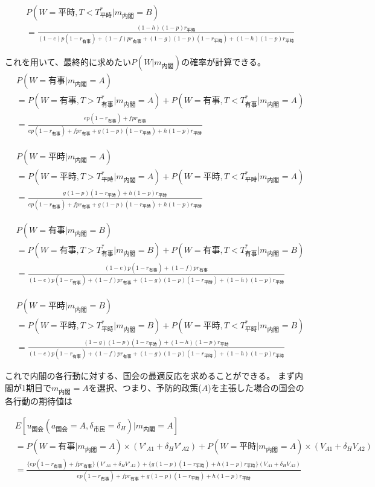 \documentclass[main.tex]{subfiles}
\begin{document}
\begin{align*}
    & P(W=平時, T<T^*_{平時} | m_{内閣}=B)\\[0.5em]
    &= \frac{ (1-h)(1-p)r_{平時} }{ (1-e)p(1-r_{有事}) + (1-f)pr_{有事} + (1-g)(1-p)(1-r_{平時}) + (1-h)(1-p)r_{平時} }
\end{align*}


これを用いて、最終的に求めたい$P(W|m_{内閣})$の確率が計算できる。
\begin{align*}
    & P(W=有事 | m_{内閣}=A)\\[0.5em]
    &= P(W=有事, T>T^*_{有事} | m_{内閣}=A) + P(W=有事, T<T^*_{有事} | m_{内閣}=A)\\[0.5em]
    &= \frac{ ep(1-r_{有事}) +  fpr_{有事}  }{ ep(1-r_{有事}) + fpr_{有事} + g(1-p)(1-r_{平時}) + h(1-p)r_{平時} }
\end{align*}

\begin{align*}
    & P(W=平時 | m_{内閣}=A)\\[0.5em]
    &= P(W=平時, T>T^*_{平時} | m_{内閣}=A) + P(W=平時, T<T^*_{平時} | m_{内閣}=A)\\[0.5em]
    &= \frac{  g(1-p)(1-r_{平時}) + h(1-p)r_{平時}  }{ ep(1-r_{有事}) + fpr_{有事} + g(1-p)(1-r_{平時}) + h(1-p)r_{平時} }
\end{align*}

\begin{align*}
    & P(W=有事 | m_{内閣}=B)\\[0.5em]
    &= P(W=有事, T>T^*_{有事} | m_{内閣}=B) + P(W=有事, T<T^*_{有事} | m_{内閣}=B)\\[0.5em]
    &= \frac{ (1-e)p(1-r_{有事}) +  (1-f)pr_{有事} }{ (1-e)p(1-r_{有事}) + (1-f)pr_{有事} + (1-g)(1-p)(1-r_{平時}) + (1-h)(1-p)r_{平時} }
\end{align*}

\begin{align*}
    & P(W=平時 | m_{内閣}=B)\\[0.5em]
    &= P(W=平時, T>T^*_{平時} | m_{内閣}=B) + P(W=平時, T<T^*_{平時} | m_{内閣}=B)\\[0.5em]
    &= \frac{ (1-g)(1-p)(1-r_{平時}) + (1-h)(1-p)r_{平時} }{ (1-e)p(1-r_{有事}) + (1-f)pr_{有事} + (1-g)(1-p)(1-r_{平時}) + (1-h)(1-p)r_{平時} }
\end{align*}

\bigskip
これで内閣の各行動に対する、国会の最適反応を求めることができる。
まず内閣が1期目で$m_{内閣}=A$を選択、つまり、予防的政策($A$)を主張した場合の国会の各行動の期待値は

\begin{align*}
    & E[u_{国会}(a_{国会}=A, \delta_{市民}=\delta_H) | m_{内閣} = A  ]\\[0.5em]
    &= P(W=有事 | m_{内閣}=A) × (V'_{A1} + \delta_H V'_{A2}) + P(W=平時 | m_{内閣}=A) × (V_{A1} + \delta_H V_{A2})\\[0.5em]
    &= \frac{ \{ep(1-r_{有事}) +  fpr_{有事}\}(V'_{A1} + \delta_H V'_{A2}) +  \{g(1-p)(1-r_{平時}) + h(1-p)r_{平時}\}(V_{A1} + \delta_H V_{A2})  }{ ep(1-r_{有事}) + fpr_{有事} + g(1-p)(1-r_{平時}) + h(1-p)r_{平時} }
\end{align*}
\end{document}
